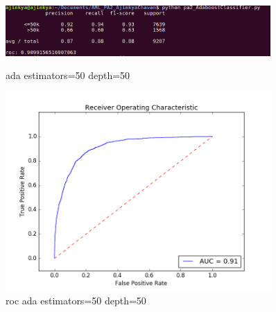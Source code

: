 \documentclass{article}
\begin{document}
\begin{figure}
    \centering
    \begin{minipage}{0.45\textwidth}
        \centering
        \includegraphics[width=0.9\textwidth]{ada_50_50.png} %
        \caption{ada estimators=50 depth=50}
    \end{minipage}\hfill
    \begin{minipage}{0.45\textwidth}
        \centering
        \includegraphics[width=0.9\textwidth]{roc_ada_50_50.png} %
        \caption{roc ada estimators=50 depth=50}
    \end{minipage}
\end{figure}
\end{document}
